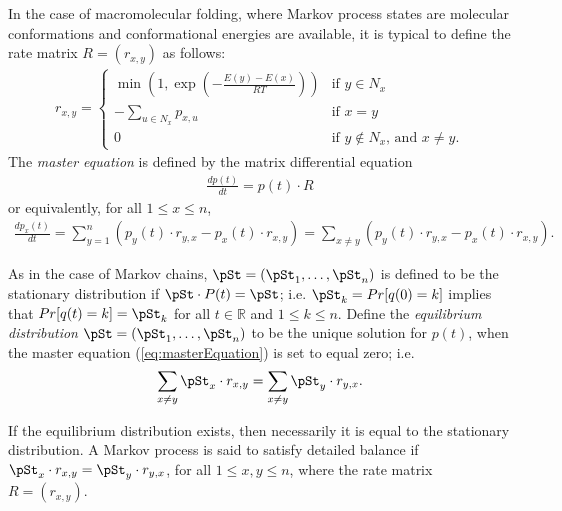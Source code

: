 In the case of macromolecular folding, where Markov process states
are molecular conformations and conformational energies are available,
it is typical to define the rate matrix
$R = (r_{x,y})$ as follows:
\begin{align}
\label{eq:transitionProb2}
r_{x,y} = \left\{
\begin{array}{ll}
\min\left(1,\exp(-\frac{E(y)-E(x)}{RT})\right)
&\mbox{if $y \in N_x$}\\
- \sum_{u \in N_x} p_{x,u} &\mbox{if $x=y$}\\
0 &\mbox{if $y \not\in N_x$, and $x \ne y$}.
\end{array} \right.
\end{align}
The {\em master equation} is defined by the matrix differential equation
\begin{align}
\label{eq:masterEquationMatrix}
\frac{d p(t)}{dt} = p(t) \cdot R
\end{align}
or equivalently, for all $1 \leq x \leq n$,
\begin{align}
\label{eq:masterEquation}
\frac{d p_x(t)}{dt} = \sum_{y=1}^n (p_y(t) \cdot r_{y,x} - p_x(t) \cdot r_{x,y})
  = \sum_{x \ne y} (p_y(t) \cdot r_{y,x} - p_x(t) \cdot r_{x,y}) .
\end{align}

As in the case of Markov chains,
$\pSt = (\pSt_1,\ldots,\pSt_n)$ is defined to be
the stationary distribution if
$\pSt \cdot P(t)= \pSt$; i.e.  $\pSt_k = Pr[ q(0) = k ]$ implies that
$Pr[ q(t) = k] = \pSt_k$ for all $t \in \mathbb{R}$ and
$1 \leq k \leq n$.
Define the {\em equilibrium distribution} $\pSt = (\pSt_1,\ldots,\pSt_n)$
to be the unique solution for $p(t)$, when the master equation
(\ref{eq:masterEquation}) is set to equal zero; i.e.
\begin{align}
\label{eq:equilibriumTime}
\sum_{x \ne y} \pSt_x \cdot r_{x,y} = \sum_{x \ne y} \pSt_y \cdot r_{y,x}.
\end{align}

If the equilibrium distribution exists, then necessarily it is equal to
the stationary distribution. A Markov process is said
to satisfy detailed balance if $\pSt_x \cdot r_{x,y} = \pSt_y \cdot r_{y,x}$,
for all $1 \leq x,y \leq n$, where the rate matrix $R = (r_{x,y})$.

